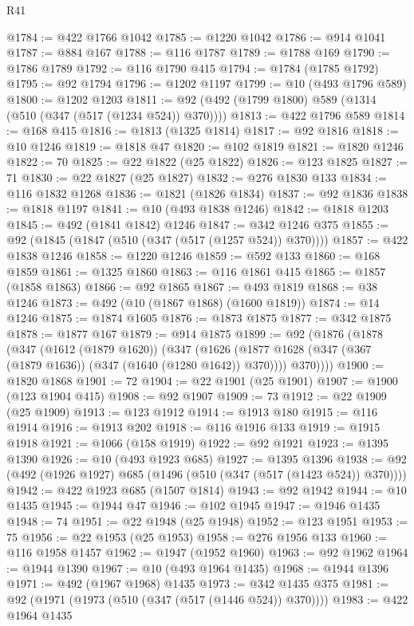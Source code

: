 \begin{lexlean}{R41}
\begin{coremodule}
@1784 := @422 @1766 @1042
@1785 := @1220 @1042
@1786 := @914 @1041
@1787 := @884 @167
@1788 := @116 @1787
@1789 := @1788 @169
@1790 := @1786 @1789
@1792 := @116 @1790 @415
@1794 := @1784 (@1785 @1792)
@1795 := @92 @1794
@1796 := @1202 @1197
@1799 := @10 (@493 @1796 @589)
@1800 := @1202 @1203
@1811 := @92 (@492 (@1799 @1800) @589 (@1314 (@510 (@347 (@517 (@1234 @524)) @370))))
@1813 := @422 @1796 @589
@1814 := @168 @415
@1816 := @1813 (@1325 @1814)
@1817 := @92 @1816
@1818 := @10 @1246
@1819 := @1818 @47
@1820 := @102 @1819
@1821 := @1820 @1246
@1822 := 70
@1825 := @22 @1822 (@25 @1822)
@1826 := @123 @1825
@1827 := 71
@1830 := @22 @1827 (@25 @1827)
@1832 := @276 @1830 @133
@1834 := @116 @1832 @1268
@1836 := @1821 (@1826 @1834)
@1837 := @92 @1836
@1838 := @1818 @1197
@1841 := @10 (@493 @1838 @1246)
@1842 := @1818 @1203
@1845 := @492 (@1841 @1842) @1246
@1847 := @342 @1246 @375
@1855 := @92 (@1845 (@1847 (@510 (@347 (@517 (@1257 @524)) @370))))
@1857 := @422 @1838 @1246
@1858 := @1220 @1246
@1859 := @592 @133
@1860 := @168 @1859
@1861 := @1325 @1860
@1863 := @116 @1861 @415
@1865 := @1857 (@1858 @1863)
@1866 := @92 @1865
@1867 := @493 @1819
@1868 := @38 @1246
@1873 := @492 (@10 (@1867 @1868) (@1600 @1819))
@1874 := @14 @1246
@1875 := @1874 @1605
@1876 := @1873 @1875
@1877 := @342 @1875
@1878 := @1877 @167
@1879 := @914 @1875
@1899 := @92
    (@1876
      (@1878
        (@347
          (@1612 (@1879 @1620))
          (@347
            (@1626 (@1877 @1628 (@347 (@367 (@1879 @1636)) (@347 (@1640 (@1280 @1642)) @370))))
            @370))))
@1900 := @1820 @1868
@1901 := 72
@1904 := @22 @1901 (@25 @1901)
@1907 := @1900 (@123 @1904 @415)
@1908 := @92 @1907
@1909 := 73
@1912 := @22 @1909 (@25 @1909)
@1913 := @123 @1912
@1914 := @1913 @180
@1915 := @116 @1914
@1916 := @1913 @202
@1918 := @116 @1916 @133
@1919 := @1915 @1918
@1921 := @1066 (@158 @1919)
@1922 := @92 @1921
@1923 := @1395 @1390
@1926 := @10 (@493 @1923 @685)
@1927 := @1395 @1396
@1938 := @92 (@492 (@1926 @1927) @685 (@1496 (@510 (@347 (@517 (@1423 @524)) @370))))
@1942 := @422 @1923 @685 (@1507 @1814)
@1943 := @92 @1942
@1944 := @10 @1435
@1945 := @1944 @47
@1946 := @102 @1945
@1947 := @1946 @1435
@1948 := 74
@1951 := @22 @1948 (@25 @1948)
@1952 := @123 @1951
@1953 := 75
@1956 := @22 @1953 (@25 @1953)
@1958 := @276 @1956 @133
@1960 := @116 @1958 @1457
@1962 := @1947 (@1952 @1960)
@1963 := @92 @1962
@1964 := @1944 @1390
@1967 := @10 (@493 @1964 @1435)
@1968 := @1944 @1396
@1971 := @492 (@1967 @1968) @1435
@1973 := @342 @1435 @375
@1981 := @92 (@1971 (@1973 (@510 (@347 (@517 (@1446 @524)) @370))))
@1983 := @422 @1964 @1435

\end{coremodule}
\end{lexlean}
